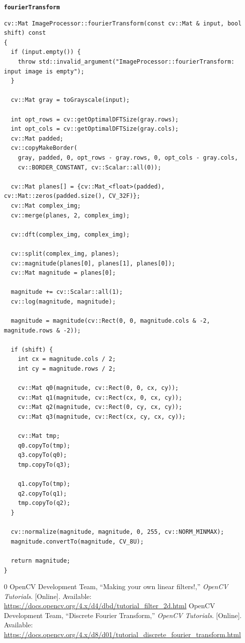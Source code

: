 \documentclass[conference]{IEEEtran}
\begin{document}
\noindent\textbf{\texttt{fourierTransform}}
\begin{lstlisting}
cv::Mat ImageProcessor::fourierTransform(const cv::Mat & input, bool shift) const
{
  if (input.empty()) {
    throw std::invalid_argument("ImageProcessor::fourierTransform: input image is empty");
  }

  cv::Mat gray = toGrayscale(input);

  int opt_rows = cv::getOptimalDFTSize(gray.rows);
  int opt_cols = cv::getOptimalDFTSize(gray.cols);
  cv::Mat padded;
  cv::copyMakeBorder(
    gray, padded, 0, opt_rows - gray.rows, 0, opt_cols - gray.cols,
    cv::BORDER_CONSTANT, cv::Scalar::all(0));

  cv::Mat planes[] = {cv::Mat_<float>(padded), cv::Mat::zeros(padded.size(), CV_32F)};
  cv::Mat complex_img;
  cv::merge(planes, 2, complex_img);

  cv::dft(complex_img, complex_img);

  cv::split(complex_img, planes);
  cv::magnitude(planes[0], planes[1], planes[0]);
  cv::Mat magnitude = planes[0];

  magnitude += cv::Scalar::all(1);
  cv::log(magnitude, magnitude);

  magnitude = magnitude(cv::Rect(0, 0, magnitude.cols & -2, magnitude.rows & -2));

  if (shift) {
    int cx = magnitude.cols / 2;
    int cy = magnitude.rows / 2;

    cv::Mat q0(magnitude, cv::Rect(0, 0, cx, cy));
    cv::Mat q1(magnitude, cv::Rect(cx, 0, cx, cy));
    cv::Mat q2(magnitude, cv::Rect(0, cy, cx, cy));
    cv::Mat q3(magnitude, cv::Rect(cx, cy, cx, cy));

    cv::Mat tmp;
    q0.copyTo(tmp);
    q3.copyTo(q0);
    tmp.copyTo(q3);

    q1.copyTo(tmp);
    q2.copyTo(q1);
    tmp.copyTo(q2);
  }

  cv::normalize(magnitude, magnitude, 0, 255, cv::NORM_MINMAX);
  magnitude.convertTo(magnitude, CV_8U);

  return magnitude;
}
\end{lstlisting}

\twocolumn
\begin{thebibliography}{0}
 OpenCV Development Team, ``Making your own linear filters!,'' \textit{OpenCV Tutorials}. [Online]. Available: \url{https://docs.opencv.org/4.x/d4/dbd/tutorial_filter_2d.html}
 OpenCV Development Team, ``Discrete Fourier Transform,'' \textit{OpenCV Tutorials}. [Online]. Available: \url{https://docs.opencv.org/4.x/d8/d01/tutorial_discrete_fourier_transform.html}
\end{thebibliography}
\end{document}
